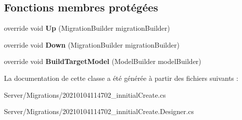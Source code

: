 \subsection*{Fonctions membres protégées}
\begin{DoxyCompactItemize}
\item 
\mbox{\label{class_mediwatch_1_1_server_1_1_migrations_1_1innitial_create_ae036630989af2c2f41f0b2257d35a8e0}} 
override void {\bfseries Up} (Migration\+Builder migration\+Builder)
\item 
\mbox{\label{class_mediwatch_1_1_server_1_1_migrations_1_1innitial_create_a8a02e197d3bd2cc0eefc6ac7814d1372}} 
override void {\bfseries Down} (Migration\+Builder migration\+Builder)
\item 
\mbox{\label{class_mediwatch_1_1_server_1_1_migrations_1_1innitial_create_ad7cc9104c9bb7f0274826a71631b8851}} 
override void {\bfseries Build\+Target\+Model} (Model\+Builder model\+Builder)
\end{DoxyCompactItemize}


La documentation de cette classe a été générée à partir des fichiers suivants \+:\begin{DoxyCompactItemize}
\item 
Server/\+Migrations/20210104114702\+\_\+innitial\+Create.\+cs\item 
Server/\+Migrations/20210104114702\+\_\+innitial\+Create.\+Designer.\+cs\end{DoxyCompactItemize}
